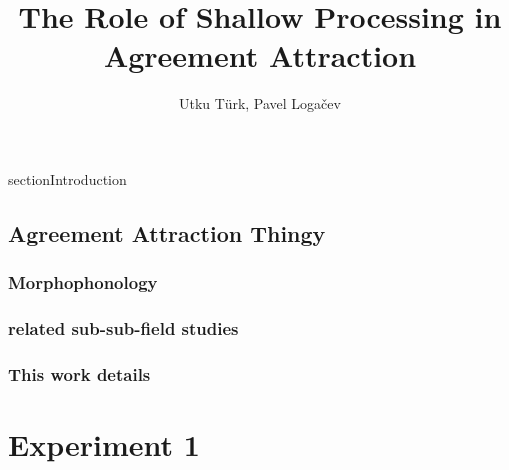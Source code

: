 \documentclass[doc,a4paper,man,natbib,floatsintext,noextraspace]{apa6}\usepackage[]{graphicx}\usepackage[]{color}
\title{The Role of Shallow Processing in Agreement Attraction}
\author{Utku Türk, Pavel Loga\v{c}ev}
\affiliation{Boğaziçi University}
\begin{document}
\maketitle

\printglossary[title=\MakeUppercase{glosses}, style=block,nonumberlist]

section{Introduction} \label{sec:Intro}
\subsection{Agreement Attraction Thingy} \label{sec:Intro:literature}
\subsubsection{Morphophonology} \label{sec:Intro:literature:morphophonology}


\subsubsection{related sub-sub-field studies} \label{sec:Intro:literature:others}

\subsubsection{This work details} \label{sec:Intro:literature:thiswork}





\section{Experiment 1} \label{sec:exp1}
\end{document}
